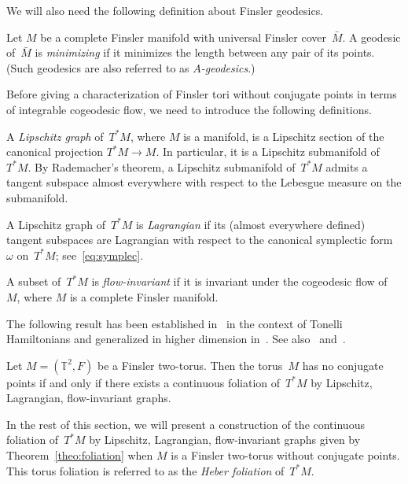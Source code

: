 \documentclass[AHL,Unicode,longabstracts,published]{cedram}
\newcommand{\T}{\mathbb{T}}
\begin{document}
We will also need the following definition about Finsler geodesics.

\begin{defi}
Let $M$ be a complete Finsler manifold with universal Finsler cover~$\bar{M}$. A geodesic of~$\bar{M}$ is \emph{minimizing} if it minimizes the length between any pair of its points. (Such geodesics are also referred to as \emph{$A$-geodesics}.)
\end{defi}


Before giving a characterization of Finsler tori without conjugate points in terms of integrable cogeodesic flow, we need to introduce the following definitions.

\begin{defi}
A \emph{Lipschitz graph} of~$T^*M$, where $M$ is a manifold, is a Lipschitz section of the canonical projection $T^*M \to M$. In particular, it is a Lipschitz submanifold of~$T^*M$. By Rademacher's theorem, a Lipschitz submanifold of~$T^*M$ admits a tangent subspace almost everywhere with respect to the Lebesgue measure on the submanifold.

A Lipschitz graph of~$T^*M$ is \emph{Lagrangian} if its (almost everywhere defined) tangent subspaces are Lagrangian with respect to the canonical symplectic form~$\omega$ on~$T^*M$; see~\eqref{eq:symplec}.

A subset of~$T^*M$ is \emph{flow-invariant} if it is invariant under the cogeodesic flow of~$M$, where $M$ is a complete Finsler manifold.
\end{defi}

The following result has been established in~\cite{MS11} in the context of Tonelli Hamiltonians and generalized in higher dimension in~\cite{AABZ15}. See also~\cite{Ba88,BP86,He32,Ma91} and~\cite{Sch15}.

\begin{theo}\label{theo:foliation}
Let $M=(\T^2,F)$ be a Finsler two-torus. Then the torus~$M$ has no conjugate points if and only if there exists a continuous foliation of~$T^* M$ by Lipschitz, Lagrangian, flow-invariant graphs.
\end{theo}

In the rest of this section, we will present a construction of the continuous foliation of~$T^* M$ by Lipschitz, Lagrangian, flow-invariant graphs given by Theorem~\ref{theo:foliation} when $M$ is a Finsler two-torus without conjugate points. This torus foliation is referred to as the \emph{Heber foliation} of~$T^*M$. \\
\end{document}
